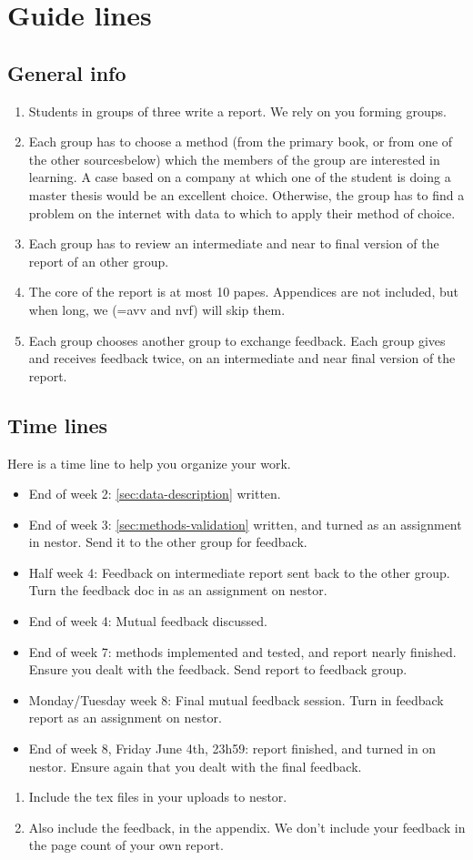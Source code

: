 \documentclass[report]{subfiles}
\begin{document}
\section*{Guide lines}
\label{sec:time-line}

\subsection*{General info}
\label{sec:general}


\begin{enumerate}
\item  Students in groups of three write a report. We rely on you forming groups.
\item Each group has to choose a method (from the primary book, or from one of the other sourcesbelow) which the members of the group are interested in learning. A case based on a company at which one of the student is doing a master thesis would be an excellent choice.
Otherwise, the group has to find a problem on the internet with data to which to apply their method of choice.
\item Each group has to review an intermediate and near to final version of the report of an other group.
\item The core of the report is at most 10 papes. Appendices are not included, but when long, we (=avv and nvf) will skip them.
\item Each group chooses another group to exchange feedback.
  Each group gives and receives feedback twice, on an intermediate and near final version of the report.
\end{enumerate}

\subsection*{Time lines}


Here is a time line to help you organize your work.

\begin{itemize}
\item End of week 2: \cref{sec:data-description} written.
\item End of week 3: \cref{sec:methods-validation} written, and turned as an assignment in nestor.
  Send it to the other group for feedback.
\item Half week 4: Feedback on intermediate report sent back to the other group.
  Turn the feedback doc in as an assignment on nestor.
\item End of week 4:   Mutual feedback discussed.
\item End of week 7: methods implemented and tested, and report nearly finished.
  Ensure you dealt with the feedback.
  Send report to feedback group.
\item Monday/Tuesday week 8: Final mutual feedback session. Turn in feedback  report as an assignment on nestor.
\item End of week 8, Friday June 4th, 23h59: report finished, and turned in on nestor.
  Ensure again that you dealt with the final feedback.
\end{itemize}

\begin{enumerate}
\item Include the tex files in your uploads to nestor.
\item Also include the feedback, in the appendix.  We don't include your feedback in the page count of your own report.
\end{enumerate}
\end{document}
